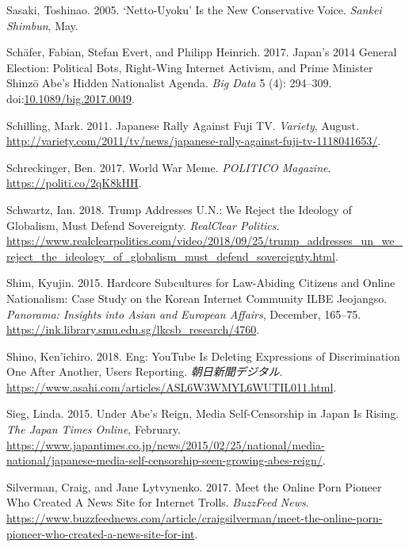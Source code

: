 \documentclass[10pt,british,A4paper,,openany]{memoir}
\begin{document}
\hypertarget{ref-sasaki_netto-uyoku_2005}{}
Sasaki, Toshinao. 2005. `Netto-Uyoku' Is the New Conservative Voice.
\emph{Sankei Shimbun}, May.

\hypertarget{ref-schafer_japans_2017}{}
Schäfer, Fabian, Stefan Evert, and Philipp Heinrich. 2017. Japan's 2014
General Election: Political Bots, Right-Wing Internet Activism, and
Prime Minister Shinzō Abe's Hidden Nationalist Agenda. \emph{Big Data} 5
(4): 294--309.
doi:\href{https://doi.org/10.1089/big.2017.0049}{10.1089/big.2017.0049}.

\hypertarget{ref-schilling_japanese_2011}{}
Schilling, Mark. 2011. Japanese Rally Against Fuji TV. \emph{Variety},
August.
\url{http://variety.com/2011/tv/news/japanese-rally-against-fuji-tv-1118041653/}.

\hypertarget{ref-schreckinger_world_2017}{}
Schreckinger, Ben. 2017. World War Meme. \emph{POLITICO Magazine}.
\url{https://politi.co/2qK8kHH}.

\hypertarget{ref-schwartz_trump_2018}{}
Schwartz, Ian. 2018. Trump Addresses U.N.: We Reject the Ideology of
Globalism, Must Defend Sovereignty. \emph{RealClear Politics}.
\url{https://www.realclearpolitics.com/video/2018/09/25/trump_addresses_un_we_reject_the_ideology_of_globalism_must_defend_sovereignty.html}.

\hypertarget{ref-shim_hardcore_2015}{}
Shim, Kyujin. 2015. Hardcore Subcultures for Law-Abiding Citizens and
Online Nationalism: Case Study on the Korean Internet Community ILBE
Jeojangso. \emph{Panorama: Insights into Asian and European Affairs},
December, 165--75.
\url{https://ink.library.smu.edu.sg/lkcsb_research/4760}.

\hypertarget{ref-shino_eng:_2018}{}
Shino, Ken'ichiro. 2018. Eng: YouTube Is Deleting Expressions of
Discrimination One After Another, Users Reporting.
\emph{朝日新聞デジタル}.
\url{https://www.asahi.com/articles/ASL6W3WMYL6WUTIL011.html}.

\hypertarget{ref-sieg_under_2015}{}
Sieg, Linda. 2015. Under Abe's Reign, Media Self-Censorship in Japan Is
Rising. \emph{The Japan Times Online}, February.
\url{https://www.japantimes.co.jp/news/2015/02/25/national/media-national/japanese-media-self-censorship-seen-growing-abes-reign/}.

\hypertarget{ref-silverman_meet_2017}{}
Silverman, Craig, and Jane Lytvynenko. 2017. Meet the Online Porn
Pioneer Who Created A News Site for Internet Trolls. \emph{BuzzFeed
News}.
\url{https://www.buzzfeednews.com/article/craigsilverman/meet-the-online-porn-pioneer-who-created-a-news-site-for-int}.
\end{document}
